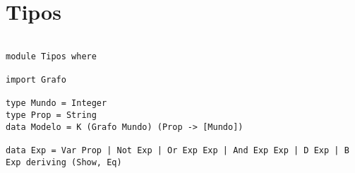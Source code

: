 \section{Tipos}

\begin{verbatim}

module Tipos where

import Grafo

type Mundo = Integer
type Prop = String
data Modelo = K (Grafo Mundo) (Prop -> [Mundo])

data Exp = Var Prop | Not Exp | Or Exp Exp | And Exp Exp | D Exp | B Exp deriving (Show, Eq)

\end{verbatim}
